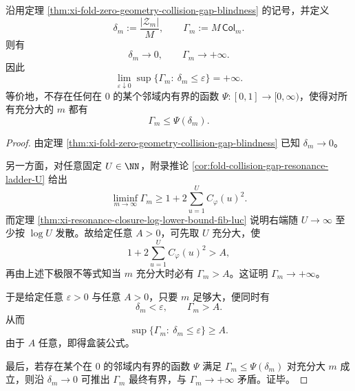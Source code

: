 \begin{corollary}[零点相对密度在近零邻域无法控制归一化碰撞尺度]\label{cor:xi-fold-zero-density-no-bounded-control-on-normalized-collision}
沿用定理 \ref{thm:xi-fold-zero-geometry-collision-gap-blindness} 的记号，并定义
\[
\delta_m:=\frac{|\mathcal Z_m|}{M},
\qquad
\Gamma_m:=M\,\mathsf{Col}_m.
\]
则有
\[
\delta_m\to 0,
\qquad
\Gamma_m\to+\infty.
\]
因此
\[
\boxed{\;
\lim_{\varepsilon\downarrow0}\sup\{\Gamma_m:\ \delta_m\le \varepsilon\}=+\infty.\;}
\]
等价地，不存在任何在 \(0\) 的某个邻域内有界的函数 \(\Psi:[0,1]\to[0,\infty)\)，使得对所有充分大的 \(m\) 都有
\[
\Gamma_m\le \Psi(\delta_m).
\]
\end{corollary}
\begin{proof}
由定理 \ref{thm:xi-fold-zero-geometry-collision-gap-blindness} 已知 \(\delta_m\to 0\)。

另一方面，对任意固定 \(U\in\NN\)，附录推论 \ref{cor:fold-collision-gap-resonance-ladder-U} 给出
\[
\liminf_{m\to\infty}\Gamma_m
\ge
1+2\sum_{u=1}^{U}C_\varphi(u)^2.
\]
而定理 \ref{thm:xi-resonance-closure-log-lower-bound-fib-luc} 说明右端随 \(U\to\infty\) 至少按 \(\log U\) 发散。故给定任意 \(A>0\)，可先取 \(U\) 充分大，使
\[
1+2\sum_{u=1}^{U}C_\varphi(u)^2>A,
\]
再由上述下极限不等式知当 \(m\) 充分大时必有 \(\Gamma_m>A\)。这证明 \(\Gamma_m\to+\infty\)。

于是给定任意 \(\varepsilon>0\) 与任意 \(A>0\)，只要 \(m\) 足够大，便同时有
\[
\delta_m<\varepsilon,
\qquad
\Gamma_m>A.
\]
从而
\[
\sup\{\Gamma_m:\ \delta_m\le \varepsilon\}\ge A.
\]
由于 \(A\) 任意，即得盒装公式。

最后，若存在某个在 \(0\) 的邻域内有界的函数 \(\Psi\) 满足
\(
\Gamma_m\le \Psi(\delta_m)
\)
对充分大 \(m\) 成立，则沿 \(\delta_m\to0\) 可推出 \(\Gamma_m\) 最终有界，与 \(\Gamma_m\to+\infty\) 矛盾。证毕。
\end{proof}

\endinput

